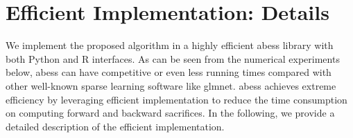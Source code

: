 \section{Efficient Implementation: Details}\label{sec:efficient-implementation}
We implement the proposed algorithm in a highly efficient \textsf{abess} library
with both Python and R interfaces.
As can be seen from the numerical experiments below,
\textsf{abess} can have competitive or even less running times
compared with other well-known sparse learning software like \textsf{glmnet}.
\textsf{abess} achieves extreme efficiency by leveraging efficient implementation to reduce the time consumption on computing forward and backward sacrifices.
In the following, we provide a detailed description of the efficient implementation.

